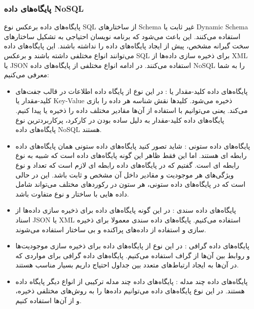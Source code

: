 \subsubsection{پایگاه‌های داده NoSQL}
پایگاه‌های داده
  برعکس نوع SQL از ساختارهای Schema غیر ثابت یا
Dynamic Schema
 استفاده می‌کنند. این باعث می‌شود که برنامه نویسان احتیاجی به تشکیل ساختارهای سخت گیرانه مشخص، پیش از ایجاد پایگاه‌های داده را نداشته باشند. این پایگاه‌های داده می‌توانند انواع مختلفی داشته باشند و برعکس SQL برای ذخیره سازی داده‌ها از XML یا JSON استفاده می‌کنند. در ادامه انواع مختلفی از پایگاه‌های داده NoSQL را به شما معرفی می‌کنیم:
\begin{itemize}
	\item
پایگاه‌های داده کلید-مقدار یا
: در این نوع از پایگاه داده اطلاعات در قالب جفت‌های کلید-مقدار یا Key-Value ذخیره می‌شود. کلیدها نقش شناسه هر داده را بازی می‌کند. یعنی می‌توانیم با استفاده از آن‌ها مقادیر مختلف داده را ذخیره یا پیدا کنیم. پایگاه‌های داده کلید-مقدار به دلیل ساده بودن در کارکرد، پرکاربرد‌ترین نوع پایگاه‌های داده NoSQL هستند.
\item
پایگاه‌های داده 
ستونی
: شاید تصور کنید پایگاه‌های داده ستونی همان پایگاه‌های داده رابطه ای هستند. اما این فقط ظاهر این گونه پایگاه‌های داده است که شبیه به نوع رابطه ای است. گفتیم که در پایگاه‌های داده رابطه ای لازم است که تعداد و نوع ویژگی‌های هر موجودیت و مقادیر داخل آن مشخص و ثابت باشد. این در حالی است که در پایگاه‌های داده ستونی، هر ستون در رکوردهای مختلف می‌تواند شامل داده هایی با ساختار و نوع متفاوت باشد.
\item
پایگاه‌های داده 
سندی
: در این گونه پایگاه‌های داده برای ذخیره سازی داده‌ها از اسناد JSON یا XML استفاده می‌کنیم. پایگاه‌های داده سندی معمولا برای ذخیره سازی و استفاده از داده‌های پراکنده و بی ساختار استفاده می‌شوند.
\item
پایگاه‌های داده 
گرافی
: در این نوع از پایگاه‌های داده برای ذخیره سازی موجودیت‌ها و روابط بین آن‌ها از گراف استفاده می‌کنیم. پایگاه‌های داده گرافی برای مواردی که در آن‌ها به ایجاد ارتباط‌های متعدد بین جداول احتیاج داریم بسیار مناسب هستند.
\item
پایگاه‌های داده چند 
مدله
: پایگاه‌های داده چند مدله ترکیبی از انواع دیگر پایگاه داده هستند. در این نوع پایگاه‌های داده می‌توانیم داده‌ها را به روش‌های مختلفی ذخیره، و از آن‌ها استفاده کنیم.

\end{itemize}

